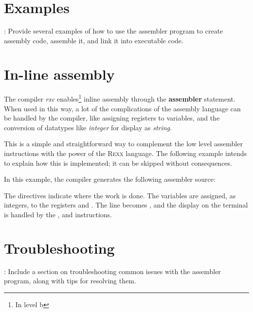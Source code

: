 \section{Examples}

: Provide several examples of how to use the assembler program to
create assembly code, assemble it, and link it into executable code.

\section{In-line assembly}
The \crexx{} compiler \emph{rxc} enables\footnote{In \crexx{} level b} inline assembly through the
\textbf{assembler} statement. When used in this way, a lot of
the complications of the assembly language can be handled by the
\crexx{} compiler, like assigning registers to variables, and the
conversion of datatypes like \emph{integer} for display as \emph{string}.


\begin{shaded}
  \small
{} \obeylines
{} \obeylines {}
 \end{shaded}

This is a simple and straightforward way to complement the low level
assembler instructions with the power of the \textsc{Rexx}
language. The following example intends to explain how this is
implemented; it can be skipped without consequences.

In this example, the compiler generates the following assembler source:


The  directives indicate where the work is done. The
variables are assigned, as integers, to the registers  and
. The line  becomes , and the display on the terminal is handled by the
  , and  instructions.

\section{Troubleshooting}

: Include a section on troubleshooting common issues with the assembler program, along with tips for resolving them.

